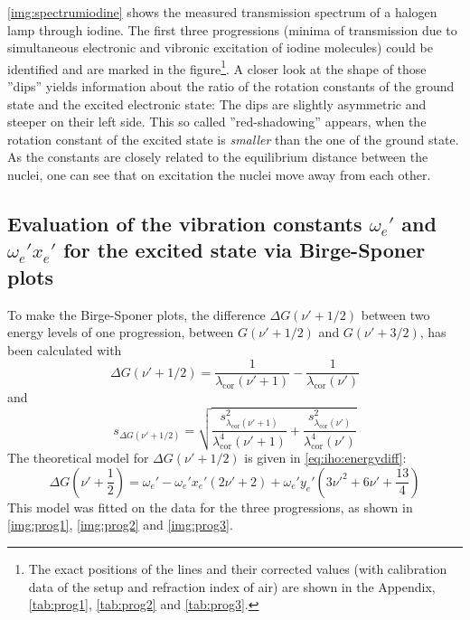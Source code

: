 \autoref{img:spectrumiodine} shows the measured transmission spectrum of a halogen lamp through iodine.
The first three progressions
(minima of transmission due to simultaneous electronic and vibronic excitation of iodine molecules)
could be identified and are marked in the
figure\footnote{The exact positions of the lines and
their corrected values (with calibration data of the setup and refraction index of air)
are shown in the Appendix, \autoref{tab:prog1}, \autoref{tab:prog2} and \autoref{tab:prog3}.}.
A closer look at the shape of those ''dips'' yields information about the ratio of the rotation constants
of the ground state and the excited electronic state:
The dips are slightly asymmetric and steeper on their left side. This so called
''red-shadowing'' appears, when the rotation constant of the excited state is \emph{smaller} than
the one of the ground state. As the constants are closely related to the equilibrium distance between the nuclei,
one can see that on excitation the nuclei move away from each other.



\subsection{Evaluation of the vibration constants \texorpdfstring{$\omega_e'$}{we'} and \texorpdfstring{$\omega_e' x_e'$}{we'xe'} for the excited state via Birge-Sponer plots}
To make the Birge-Sponer plots,
the difference $\Delta G(\nu' +1/2)$ between two energy levels of one progression,
between $G(\nu' +1/2)$ and  $G(\nu' +3/2)$,
has been calculated with
\begin{equation}
  \Delta G(\nu' +1/2)=\frac{1}{\lambda_{\text{cor}}(\nu'+1)}-\frac{1}{\lambda_{\text{cor}}(\nu')}
\end{equation}
and
\begin{equation}
  s_{\Delta G(\nu' +1/2)}=
  \sqrt{\frac{s^2_{\lambda_{\text{cor}}(\nu'+1)}}{\lambda^4_{\text{cor}}(\nu'+1)}+
  \frac{s^2_{\lambda_{\text{cor}}(\nu')}}{\lambda^4_{\text{cor}}(\nu')}}
\end{equation}
The theoretical model for $\Delta G(\nu' +1/2)$ is given in \autoref{eq:iho:energydiff}:
\begin{equation}
  \Delta G(\nu' + \frac{1}{2})=\omega_e' - \omega_e' x_e'(2\nu'+2) + \omega_e' y_e'(3\nu'^2 + 6 \nu' +\frac{13}{4})
\end{equation}
This model was fitted on the data for the three progressions, as shown in \autoref{img:prog1},
\autoref{img:prog2} and \autoref{img:prog3}.

